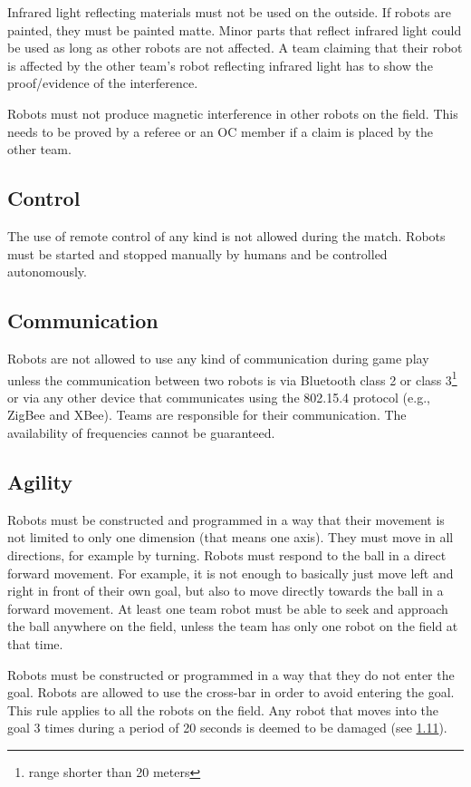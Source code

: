 \documentclass{article}
\begin{document}
Infrared light reflecting materials must not be used on the outside. If robots
are painted, they must be painted matte. Minor parts that reflect infrared
light could be used as long as other robots are not affected. A team claiming
that their robot is affected by the other team's robot reflecting infrared
light has to show the proof/evidence of the interference.

Robots must not produce magnetic interference in other robots on the field.
This needs to be proved by a referee or an OC member if a claim is placed by
the other team.

\subsection{ Control \label{ref-021}}

The use of remote control of any kind is not allowed during the match. Robots
must be started and stopped manually by humans and be controlled autonomously.

\subsection{ Communication \label{ref-022}}

Robots are not allowed to use any kind of communication during game play unless
the communication between two robots is via Bluetooth class 2 or class
3\footnote{range shorter than 20 meters} or via any other device that
communicates using the 802.15.4 protocol (e.g., ZigBee and XBee). Teams are
responsible for their communication. The availability of frequencies cannot be
guaranteed.

\subsection{ Agility \label{ref-023}}

Robots must be constructed and programmed in a way that their movement is not
limited to only one dimension (that means one axis). They must move in all
directions, for example by turning. Robots must respond to the ball in a direct
forward movement. For example, it is not enough to basically just move left and
right in front of their own goal, but also to move directly towards the ball in
a forward movement. At least one team robot must be able to seek and approach
the ball anywhere on the field, unless the team has only one robot on the field
at that time.

Robots must be constructed or programmed in a way that they do not enter the
goal. Robots are allowed to use the cross-bar in order to avoid entering the
goal. This rule applies to all the robots on the field. Any robot that moves
into the goal 3 times during a period of 20 seconds is deemed to be damaged
(see \hyperref[ref-012]{1.11}).
\end{document}
